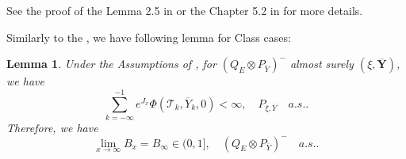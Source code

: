 \documentclass[]{article}
\makeatletter
\numberwithin{equation}{section}
\renewenvironment{proof}[1][\proofname]{%
	\par\pushQED{\qed}\normalfont%
	\topsep6\p@\@plus6\p@\relax
	\trivlist\item[\hskip\labelsep\bfseries#1\@addpunct{.}]%
	\ignorespaces
}{%
	\popQED\endtrivlist\@endpefalse
}
\theoremstyle{thmstyleone}%
\theoremstyle{thmstyletwo}%
\theoremstyle{thmstylethree}%
\theoremstyle{thmstylefour}%
\newtheorem{lemma}{Lemma}
\theoremstyle{thmstylefive}%
\theoremstyle{thmstylesix}%
\makeatother
\begin{document}
	\begin{proof}[Proof of \Cref{lemma2 for intermediately}]
		See the proof of the Lemma 2.5 in \cite{Afanasyev2005} or the Chapter 5.2 in \cite{B2} for more details.
	\end{proof}
	
	Similarly to the , we have following lemma for Class  cases:
	
	\begin{lemma}\label{lemma1 for intermediately}
		Under the Assumptions of , for $ (Q_E\otimes P_{\overline{Y}})^{-} $ almost surely $(\xi,\overline{\textbf{Y}})$, we have
		\begin{equation*} \sum_{k=-\infty}^{-1}e^{J_x}\Phi(\mathcal{T}_k,\overline{Y}_k,0) <\infty, \quad P_{\xi,\overline{Y}} \quad  a.s..
		\end{equation*}
		Therefore, we have
		\begin{equation*}
			\lim\limits_{x\rightarrow\infty}B_x =B_\infty \in (0,1],\quad \left(Q_E\otimes P_{\overline{Y}}\right)^{-}\quad a.s..
		\end{equation*}
	\end{lemma}
	
\end{document}
